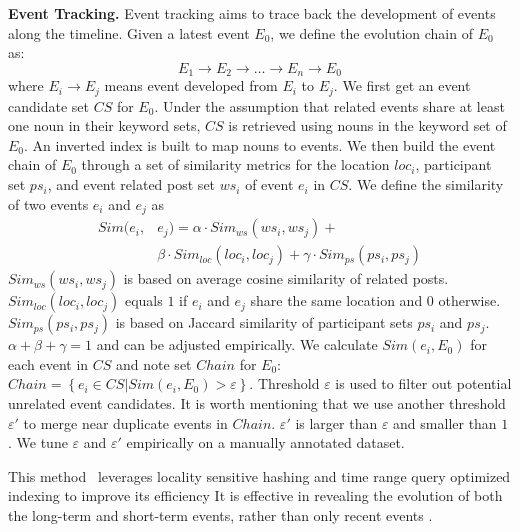 \noindent\textbf{Event Tracking.}
\label{tracing}
Event tracking aims to trace back the development of events along the timeline.
Given a latest event $E_{0}$, we define the evolution
chain of $E_{0}$ as:
\begin{equation}
E_{1}\rightarrow E_{2}\rightarrow\ldots\rightarrow E_{n}\rightarrow E_{0}
\end{equation}
where $E_{i}\rightarrow E_{j}$ means event developed from $E_{i}$ to $E_{j}$.
We first get an event candidate set $CS$ for $E_{0}$.
Under the assumption that related events share at least one noun in their keyword sets,
$CS$ is retrieved using nouns in the keyword set of $E_{0}$.
An inverted index is built to map nouns to events.
We then build the event chain of $E_{0}$ through a set of similarity metrics for
the location $loc_{i}$, participant set $ps_{i}$, and event related post set $ws_{i}$
of event $e_{i}$ in $CS$.
We define the similarity of two events $e_{i}$ and $e_{j}$ as
\begin{equation}
\begin{aligned}
Sim(e_{i}, &e_{j})=\alpha\cdot Sim_{ws}(ws_{i},ws_{j}) + \\& \beta\cdot Sim_{loc}(loc_{i},loc_{j})
+ \gamma\cdot Sim_{ps}(ps_{i},ps_{j})
\end{aligned}
\end{equation}
$Sim_{ws}(ws_{i},ws_{j})$ is based on average cosine similarity of related posts.
$Sim_{loc}(loc_{i},loc_{j})$ equals $1$ if $e_{i}$ and $e_{j}$ share the same location and 0 otherwise.
$Sim_{ps}(ps_{i},ps_{j})$ is based on Jaccard similarity of participant sets $ps_{i}$ and $ps_{j}$.
$\alpha+\beta+\gamma=1$ and can be adjusted empirically.
We calculate $Sim(e_{i}, E_{0})$ for each event in $CS$ and note set $Chain$ for $E_{0}$:
$Chain=\left\{ e_{i} \in CS | Sim(e_{i}, E_{0}) > \varepsilon \right\}$.
Threshold $\varepsilon$ is used to filter out potential unrelated event candidates.
It is worth mentioning that we use another threshold $\varepsilon '$ to merge near duplicate events in $Chain$.
$\varepsilon '$ is larger than $\varepsilon$ and smaller than $1$.
We tune $\varepsilon$ and $\varepsilon '$ empirically on a manually annotated dataset.

This method~\cite{lu2015discovering} leverages locality sensitive hashing and time range query optimized indexing to improve its efficiency
It is effective in revealing the evolution of both the long-term and short-term events,
rather than only recent events \cite{lee2014cast, saha2012learning}.

